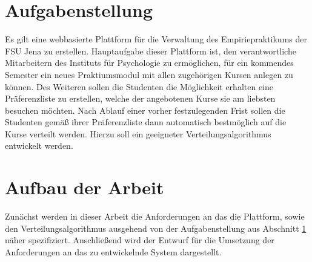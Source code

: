     \section{Aufgabenstellung}
    \label{sec:task}
        Es gilt eine webbasierte Plattform für die Verwaltung des Empiriepraktikums der FSU Jena zu erstellen.
        Hauptaufgabe dieser Plattform ist, den verantwortliche Mitarbeitern des Instituts für Psychologie zu ermöglichen, für ein kommendes Semester ein neues Praktiumsmodul mit allen zugehörigen Kursen anlegen zu können.
        Des Weiteren sollen die Studenten die Möglichkeit erhalten eine Präferenzliste zu erstellen, welche der angebotenen Kurse sie am liebsten besuchen möchten.
        Nach Ablauf einer vorher festzulegenden Frist sollen die Studenten gemäß ihrer Präferenzliste dann automatisch bestmöglich auf die Kurse verteilt werden.
        Hierzu soll ein geeigneter Verteilungsalgorithmus entwickelt werden.


    \section{Aufbau der Arbeit}
    \label{sec:structure}
       Zunächst werden in dieser Arbeit die Anforderungen an das die Plattform, sowie den Verteilungsalgorithmus ausgehend von der Aufgabenstellung aus Abschnitt \ref{sec:task} näher spezifiziert.
       Anschließend wird der Entwurf für die Umsetzung der Anforderungen an das zu entwickelnde System dargestellt.